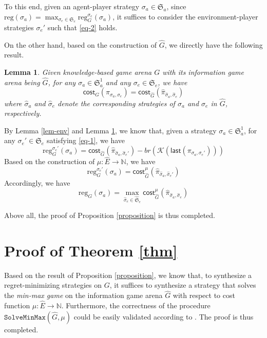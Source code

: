 \documentclass{ifacconf}
\newtheorem{lemma}{Lemma}
\def \K{\mathcal{K}}
\def \NN{\mathbb{N}}
\def \last{\textsf{last}}
\def \reg{\text{reg}}
\def \cost{\textsf{cost}}
\def \S{\mathfrak{S}}
\begin{document}
To this end, given an agent-player strategy $\sigma_a\in\S_a$, since $\reg(\sigma_a)\!=\!\max_{\sigma_e\in\S_e}\reg_G^{\sigma_e}(\sigma_a)$, it suffices to consider the environment-player strategies $\sigma_e'$ such that \eqref{eq-2} holds.

On the other hand, based on the construction of $\hat{G}$, we directly have the following result.

\begin{lemma}\label{lem-one2one}
Given knowledge-based game arena $G$ with its information game arena being $\hat{G}$, for any $\sigma_a\in\S_a^1$ and any $\sigma_e\in\S_e$, we have
\begin{equation}
    \cost_G(\pi_{\sigma_a,\sigma_e})=\cost_{\hat{G}}(\hat{\pi}_{\hat{\sigma}_a,\hat{\sigma}_e})
\end{equation}
where $\hat{\sigma}_a$ and $\hat{\sigma}_e$ denote the corresponding strategies of $\sigma_a$ and $\sigma_e$ in $\hat{G}$, respectively.
\end{lemma}

By Lemma \ref{lem-env} and Lemma \ref{lem-one2one}, we know that, given a strategy $\sigma_a\in\S_a^1$, for any $\sigma_e'\in\S_e$ satisfying \eqref{eq-1}, we have
\begin{equation}
    \reg_G^{\sigma_e'}(\sigma_a)=\cost_{\hat{G}}(\hat{\pi}_{\hat{\sigma}_a,\hat{\sigma}_e'})-br(\K(\last(\pi_{\sigma_a,\sigma_e'})))
\end{equation}
Based on the construction of $\mu\!:\!\hat{E}\!\to\!\NN$, we have
\begin{equation}
    \reg_G^{\sigma_e'}(\sigma_a)=\cost_{\hat{G}}^\mu(\hat{\pi}_{\hat{\sigma}_a,\hat{\sigma}_e'})
\end{equation}
Accordingly, we have
\begin{equation}
    \reg_G(\sigma_a)=\max_{\hat{\sigma}_e\in\hat{\S}_e}\cost_{\hat{G}}^\mu(\hat{\pi}_{\hat{\sigma}_a,\hat{\sigma}_e})
\end{equation}

Above all, the proof of Proposition \ref{proposition} is thus completed.



\section{Proof of Theorem \ref{thm}}\label{apdx:thm}

Based on the result of Proposition \ref{proposition}, we know that, to synthesize a regret-minimizing strategies on $G$, it suffices to synthesize a strategy that solves the \emph{min-max game} on the information game arena $\hat{G}$ with respect to cost function $\mu:\hat{E}\to\NN$. Furthermore, the correctness of the procedure $\texttt{SolveMinMax}(\hat{G},\mu)$ could be easily validated according to \cite{brihaye2017pseudopolynomial}. The proof is thus completed.
\end{document}
